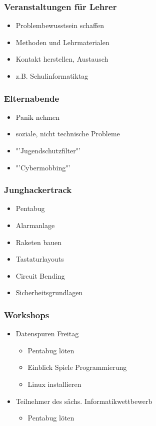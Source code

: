 \documentclass[12pt]{beamer}
\begin{document}
\begin{frame}
  \frametitle{Veranstaltungen für Lehrer}
  \begin{itemize}
    \item<2-> Problembewusstsein schaffen
    \item<3-> Methoden und Lehrmaterialen
    \item<4-> Kontakt herstellen, Austausch
    \item<5-> z.B. Schulinformatiktag
  \end{itemize}
\end{frame}

\begin{frame}
  \frametitle{Elternabende}
  \begin{itemize}
    \item<2-> Panik nehmen
    \item<3-> soziale, nicht technische Probleme
    \item<4-> "'Jugendschutzfilter"'
    \item<5-> "'Cybermobbing"'
  \end{itemize}
\end{frame}

\begin{frame}
  \frametitle{Junghackertrack}
  \begin{itemize}
    \item<2-> Pentabug
    \item<3-> Alarmanlage
    \item<4-> Raketen bauen
    \item<5-> Tastaturlayouts
    \item<6-> Circuit Bending
    \item<7-> Sicherheitsgrundlagen
  \end{itemize}
\end{frame}

\begin{frame}
  \frametitle{Workshops}
  \begin{itemize}
    \item<2-> Datenspuren Freitag
    \begin{itemize}
      \item<2-> Pentabug löten
      \item<2-> Einblick Spiele Programmierung
      \item<2-> Linux installieren
    \end{itemize}
    \item<3-> Teilnehmer des sächs. Informatikwettbewerb
    \begin{itemize}
      \item<3-> Pentabug löten
    \end{itemize}
  \end{itemize}
\end{frame}
\end{document}
